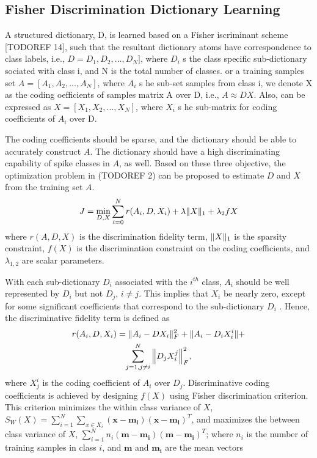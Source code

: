 \documentclass[conference]{IEEEtran}
\begin{document}
	\subsection{Fisher Discrimination Dictionary Learning}
	A structured dictionary, D, is learned based on a Fisher iscriminant scheme [TODOREF 14], such that the resultant dictionary atoms have correspondence to class labels, i.e., $D = D_1, D_2, ..., D_N]$, where $D_i$ s the class specific sub-dictionary sociated with class i, and N is the total number of classes. or a training samples set $A = [A_1, A_2, ..., A_N]$, where $A_i$ s he sub-set samples from class i, we denote X as the coding oefficients of samples matrix A over D, i.e., $A \approx DX$. Also,  can be expressed as $X = [X_1, X_2, ..., X_N]$, where $X_i$ s he sub-matrix for coding coefficients of $A_i$ over D.
	
	The coding coefficients should be sparse, and the dictionary should be able to accurately construct $A$. The dictionary should have a high discriminating capability of spike classes in $A$, as well. Based on these three objective, the optimization problem in (TODOREF 2) can be proposed to estimate $D$ and $X$ from the training set $A$.
	\begin{equation}
		J=\min_{D,X}\sum_{i=0}^{N}r(A_i,D,X_i)+\lambda\Vert{X}\Vert_1+\lambda_2f{X}
	\end{equation}
	where $r(A, D, X)$ is the discrimination fidelity term, $\Vert{X}\Vert_1$ is the sparsity constraint, $f(X)$ is the discrimination constraint on the coding coefficients, and $\lambda_{1,2}$ are scalar parameters.
	
	With each sub-dictionary $D_i$ associated with the $i^{th}$ class, $A_i$ should be well represented by $D_i$ but not $D_j$, $i \neq j$. This implies that $X_i$ be nearly zero, except for some significant coefficients that correspond to the sub-dictionary $D_i$ . Hence, the discriminative fidelity term is defined as
	\begin{multline}
		r(A_i,D,X_i)=\Vert{A_i-DX_i}\Vert_F^2+\Vert{A_i-D_iX_i^i}\Vert+ \\
		\sum_{j=1,j\neq i}^{N}\Big\Vert{D_jX_i^j}\Big\Vert_F^2,
	\end{multline}
	where $X_j^i$ is the coding coefficient of $A_i$ over $D_j$. Discriminative coding coefficients is achieved by designing $f(X)$ using Fisher discrimination criterion. This criterion minimizes the within class variance of $X$, $S_W(X)=\sum_{i=1}^{N}\sum_{x\in X_i}(\mathrm{\textbf{x}}-\mathrm{\textbf{m}}_
	\mathrm{\textbf{i}})(\mathrm{\textbf{x}}-\mathrm{\textbf{m}}_\mathrm{\textbf{i}})^T$, and maximizes the between class variance of $X$, $\sum_{i=1}^{N}n_i(\mathrm{\textbf{m}}-\mathrm{\textbf{m}}_\mathrm{\textbf{i}})(\mathrm{\textbf{m}}-\mathrm{\textbf{m}}_\mathrm{\textbf{i}})^T$; where $n_i$ is the number of training samples in class $i$, and $\mathrm{\textbf{m}}$ and $\mathrm{\textbf{m}}_\mathrm{\textbf{i}}$ are the mean vectors
	
\end{document}
